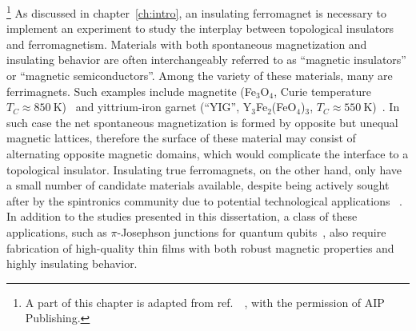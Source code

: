 \footnote[2]{A part of this chapter is adapted from ref.~\cite{EuS_PLD}~, with the permission of AIP Publishing.}%
As discussed in chapter~\ref{ch:intro}, an insulating ferromagnet is necessary to implement an experiment to study the interplay between topological insulators and ferromagnetism. Materials with both spontaneous magnetization and insulating behavior are often interchangeably referred to as ``magnetic insulators'' or ``magnetic semiconductors''. Among the variety of these materials, many are ferrimagnets. Such examples include magnetite (Fe$_3$O$_4$, Curie temperature $T_C\approx850~\mathrm{K}$)~\cite{Neel1948} and yittrium-iron garnet (``YIG'', Y$_3$Fe$_2$(FeO$_4$)$_3$, $T_C\approx550~\mathrm{K}$)~\cite{YIG}. In such case the net spontaneous magnetization is formed by opposite but unequal magnetic lattices, therefore the surface of these material may consist of alternating opposite magnetic domains, which would complicate the interface to a topological insulator. Insulating true ferromagnets, on the other hand, only have a small number of candidate materials available, despite being actively sought after by the spintronics community due to potential technological applications \cite[][p.~329]{kittel}~\cite{Yi2014, Wolf2001, EuS_spin_filter, EuS_app1, EuS_spin_filter2}. In addition to the studies presented in this dissertation, a class of these applications, such as $\pi$-Josephson junctions for quantum qubits~\cite{pi_qubit, pi_junction, Jing}, also require fabrication of high-quality thin films with both robust magnetic properties and highly insulating behavior.

